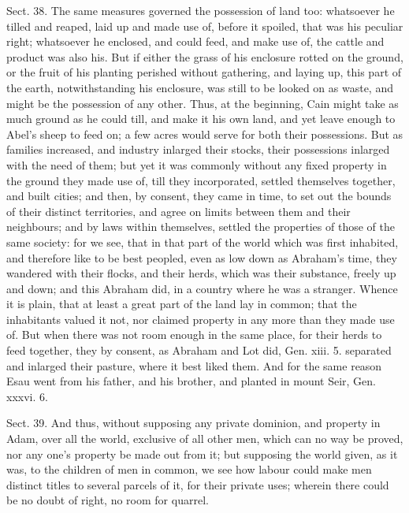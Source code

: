 \documentclass[11pt,openany]{book}
\begin{document}
Sect. 38. The same measures governed the possession of land too: whatsoever he tilled and reaped, laid up and made use of, before it spoiled, that was his peculiar right; whatsoever he enclosed, and could feed, and make use of, the cattle and product was also his. But if either the grass of his enclosure rotted on the ground, or the fruit of his planting perished without gathering, and laying up, this part of the earth, notwithstanding his enclosure, was still to be looked on as waste, and might be the possession of any other. Thus, at the beginning, Cain might take as much ground as he could till, and make it his own land, and yet leave enough to Abel's sheep to feed on; a few acres would serve for both their possessions. But as families increased, and industry inlarged their stocks, their possessions inlarged with the need of them; but yet it was commonly without any fixed property in the ground they made use of, till they incorporated, settled themselves together, and built cities; and then, by consent, they came in time, to set out the bounds of their distinct territories, and agree on limits between them and their neighbours; and by laws within themselves, settled the properties of those of the same society: for we see, that in that part of the world which was first inhabited, and therefore like to be best peopled, even as low down as Abraham's time, they wandered with their flocks, and their herds, which was their substance, freely up and down; and this Abraham did, in a country where he was a stranger. Whence it is plain, that at least a great part of the land lay in common; that the inhabitants valued it not, nor claimed property in any more than they made use of. But when there was not room enough in the same place, for their herds to feed together, they by consent, as Abraham and Lot did, Gen. xiii. 5. separated and inlarged their pasture, where it best liked them. And for the same reason Esau went from his father, and his brother, and planted in mount Seir, Gen. xxxvi. 6.

Sect. 39. And thus, without supposing any private dominion, and property in Adam, over all the world, exclusive of all other men, which can no way be proved, nor any one's property be made out from it; but supposing the world given, as it was, to the children of men in common, we see how labour could make men distinct titles to several parcels of it, for their private uses; wherein there could be no doubt of right, no room for quarrel.
\end{document}
